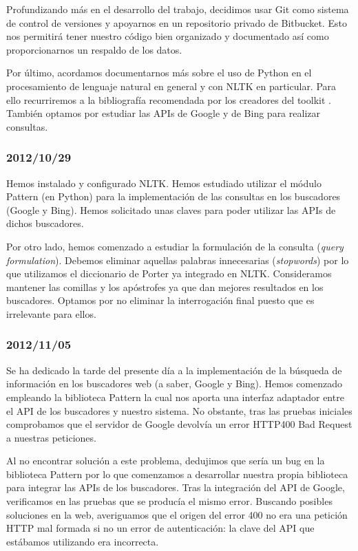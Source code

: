\documentclass[12pt,a4paper,titlepage]{article}
\begin{document}
Profundizando más en el desarrollo del trabajo, decidimos usar Git como sistema de control de versiones y apoyarnos en un repositorio privado de Bitbucket. Esto nos permitirá tener nuestro código bien organizado y documentado así como proporcionarnos un respaldo de los datos.

Por último, acordamos documentarnos más sobre el uso de Python en el procesamiento de lenguaje natural en general y con NLTK en particular. Para ello recurriremos a la bibliografía recomendada por los creadores del toolkit \cite{nltk-book}. También optamos por estudiar las APIs de Google y de Bing para realizar consultas.

\subsubsection*{2012/10/29}
Hemos instalado y configurado NLTK. Hemos estudiado utilizar el módulo Pattern (en Python) para la implementación de las consultas en los buscadores (Google y Bing). Hemos solicitado unas claves para poder utilizar las APIs de dichos buscadores.

Por otro lado, hemos comenzado a estudiar la formulación de la consulta (\emph{query formulation}). Debemos eliminar aquellas palabras innecesarias (\emph{stopwords}) por lo que utilizamos el diccionario de Porter ya integrado en NLTK. Consideramos mantener las comillas y los apóstrofes ya que dan mejores resultados en los buscadores. Optamos por no eliminar la interrogación final puesto que es irrelevante para ellos.

\subsubsection*{2012/11/05}
Se ha dedicado la tarde del presente día a la implementación de la búsqueda de información en los buscadores web (a saber, Google y Bing). Hemos comenzado empleando la biblioteca Pattern\cite{pattern-web} la cual nos aporta una interfaz adaptador entre el API de los buscadores y nuestro sistema. No obstante, tras las pruebas iniciales comprobamos que el servidor de Google devolvía un error HTTP400 Bad Request a nuestras peticiones.

Al no encontrar solución a este problema, dedujimos que sería un bug en la biblioteca Pattern por lo que comenzamos a desarrollar nuestra propia biblioteca para integrar las APIs de los buscadores. Tras la integración del API de Google, verificamos en las pruebas que se producía el mismo error. Buscando posibles soluciones en la web, averiguamos que el origen del error 400 no era una petición HTTP mal formada si no un error de autenticación: la clave del API que estábamos utilizando era incorrecta.
\end{document}
